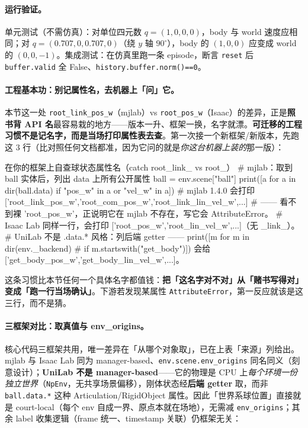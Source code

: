 \paragraph{运行验证。}单元测试（不需仿真）：对单位四元数 $q=(1,0,0,0)$，body 与 world 速度应相同；对 $q=(0.707,0,0.707,0)$（绕 $y$ 轴 $90^\circ$），body 的 $(1,0,0)$ 应变成 world 的 $(0,0,-1)$。集成测试：在仿真里跑一条 episode，断言 \verb|reset| 后 \verb|buffer.valid| 全 False、\verb|history.buffer.norm()==0|。

\paragraph{工程基本功：别记属性名，去机器上「问」它。}本节这一处 \texttt{root\_link\_pos\_w}（mjlab）vs \texttt{root\_pos\_w}（Isaac）的差异，正是\textbf{照书背 API 名}最容易栽的地方——版本一升、框架一换，名字就漂。\textbf{可迁移的工程习惯不是记名字，而是当场打印属性表去查}。第一次接一个新框架/新版本，先跑这 $3$ 行（比对照任何文档都准，因为它问的就是\emph{你这台机器上装的}那一版）：

\begin{codebox}[Python]{在你的框架上自查球状态属性名（catch root\_link\_ vs root\_）}
# mjlab：取到 ball 实体后，列出 data 上所有公开属性
ball = env.scene["ball"]
print([a for a in dir(ball.data) if "pos_w" in a or "vel_w" in a])
# mjlab 1.4.0 会打印 ['root_link_pos_w','root_com_pos_w','root_link_lin_vel_w',...]
#   —— 看不到裸 'root_pos_w'，正说明它在 mjlab 不存在，写它会 AttributeError。
# Isaac Lab 同样一行，会打印 ['root_pos_w','root_lin_vel_w',...]（无 _link_）。
# UniLab 不是 .data.* 风格：列后端 getter —— print([m for m in dir(env._backend)
#   if m.startswith("get_body")]) 会给 ['get_body_pos_w','get_body_lin_vel_w',...]。
\end{codebox}

\noindent 这条习惯比本节任何一个具体名字都值钱：\textbf{把「这名字对不对」从「赌书写得对」变成「跑一行当场确认」}。下游若发现某属性 \texttt{AttributeError}，第一反应就该是这三行，而不是猜。

\paragraph{三框架对比：取真值与 env\_origins。}核心代码三框架共用，唯一差异在「从哪个对象取」，已在上表「来源」列给出。mjlab 与 Isaac Lab 同为 manager-based、\verb|env.scene.env_origins| 同名同义（刻意设计）；\textbf{UniLab 不是 manager-based}——它的物理是 CPU 上\emph{每个环境一份独立世界}（\verb|NpEnv|，无共享场景偏移），刚体状态经\textbf{后端 getter} 取，而非 \verb|ball.data.*| 这种 Articulation/RigidObject 属性。因此「世界系球位置」直接就是 court-local（每个 env 自成一界、原点本就在场地），无需减 \verb|env_origins|；其余 label 收集逻辑（frame 统一、timestamp 关联）仍框架无关：

